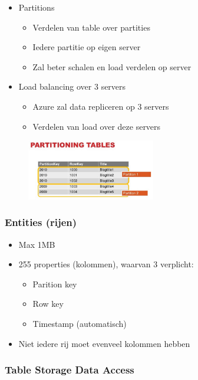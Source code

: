 \documentclass{article}
\begin{document}
\begin{itemize}
    \item Partitions
    \begin{itemize}
        \item Verdelen van table over partities
        \item Iedere partitie op eigen server
        \item Zal beter schalen en load verdelen op server
    \end{itemize}
    \item Load balancing over 3 servers
    \begin{itemize}
        \item Azure zal data repliceren op 3 servers
        \item Verdelen van load over deze servers
    \end{itemize}
\end{itemize}

\begin{figure}[H]
    \centering
    \includegraphics[width=0.5\textwidth]{partitioning-tables.png}
    \caption{}
\end{figure}

\subsubsection{Entities (rijen)}

\begin{itemize}
    \item Max 1MB
    \item 255 properties (kolommen), waarvan 3 verplicht:
    \begin{itemize}
        \item Parition key
        \item Row key
        \item Timestamp (automatisch)
    \end{itemize}
    \item Niet iedere rij moet evenveel kolommen hebben
\end{itemize}

\subsubsection{Table Storage Data Access}
\end{document}
